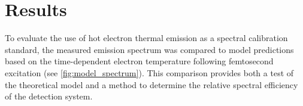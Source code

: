 \documentclass[
	parskip=half,
	a4paper,
]{scrarticle}
\begin{document}



\section{Results}

To evaluate the use of hot electron thermal emission as a spectral calibration standard, the measured emission spectrum was compared to model predictions based on the time-dependent electron temperature following femtosecond excitation (see \autoref{fig:model_spectrum}). This comparison provides both a test of the theoretical model and a method to determine the relative spectral efficiency of the detection system.
\end{document}
